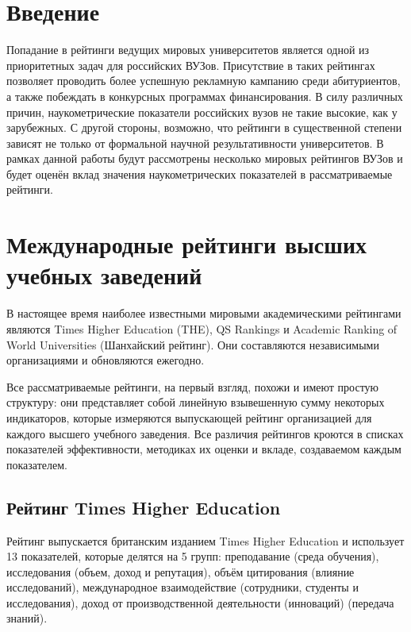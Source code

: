 \section{Введение}

Попадание в рейтинги ведущих мировых университетов является одной из приоритетных
задач для российских ВУЗов. Присутствие в таких рейтингах позволяет
проводить более успешную рекламную кампанию среди абитуриентов, а также
побеждать в конкурсных программах финансирования. В силу различных причин,
наукометрические показатели российских вузов не такие высокие, как у зарубежных.
С другой стороны, возможно, что рейтинги в существенной степени зависят не только
от формальной научной результативности университетов. В рамках данной
работы будут рассмотрены несколько мировых рейтингов ВУЗов и будет оценён
вклад значения наукометрических показателей в рассматриваемые рейтинги.

\section{Международные рейтинги высших учебных заведений}

В настоящее время наиболее известными мировыми академическими рейтингами
являются Times Higher Education (THE), QS Rankings и Academic Ranking of World Universities (Шанхайский рейтинг).
Они составляются независимыми организациями и обновляются ежегодно.

Все рассматриваемые рейтинги, на первый взгляд, похожи и имеют простую структуру:
они представляет собой линейную взывешенную сумму некоторых индикаторов, которые
измеряются выпускающей рейтинг организацией для каждого высшего учебного заведения.
Все различия рейтингов кроются в списках показателей эффективности, методиках их оценки
и вкладе, создаваемом каждым показателем.

\subsection{Рейтинг Times Higher Education}

Рейтинг выпускается британским изданием Times Higher Education и
использует 13 показателей, которые делятся на 5 групп: преподавание
(среда обучения), исследования (объем, доход и репутация), объём цитирования (влияние исследований),
международное взаимодействие (сотрудники, студенты и исследования), доход от производственной
деятельности (инноваций) (передача знаний).

